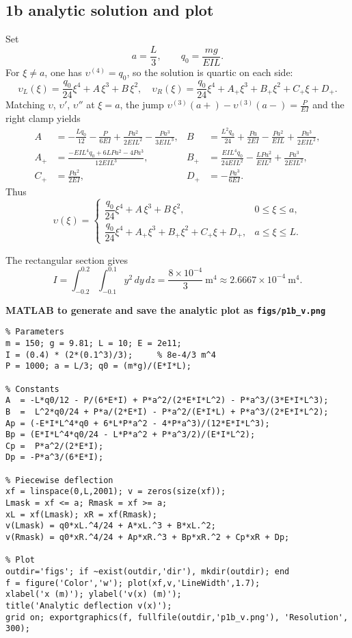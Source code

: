 \documentclass[12pt,a4paper]{article}
\begin{document}
\subsection*{1b  analytic solution and plot}

Set
\[
a=\frac{L}{3},\qquad q_{0}=\frac{m g}{E I L}.
\]
For $\xi\neq a$, one has $\upsilon^{(4)}=q_{0}$, so the solution is quartic on each side:
\[
\upsilon_{L}(\xi)=\frac{q_{0}}{24}\xi^{4}+A\,\xi^{3}+B\,\xi^{2},\quad
\upsilon_{R}(\xi)=\frac{q_{0}}{24}\xi^{4}+A_{+}\xi^{3}+B_{+}\xi^{2}+C_{+}\xi+D_{+}.
\]
Matching $\upsilon$, $\upsilon'$, $\upsilon''$ at $\xi=a$, the jump
\(
\upsilon^{(3)}(a+)-\upsilon^{(3)}(a-)=\frac{P}{E I}
\)
and the right clamp yields
\[
\begin{aligned}
A&=-\frac{L q_{0}}{12}-\frac{P}{6 E I}+\frac{P a^{2}}{2 E I L^{2}}-\frac{P a^{3}}{3 E I L^{3}},
&
B&=\frac{L^{2}q_{0}}{24}+\frac{P a}{2E I}-\frac{P a^{2}}{E I L}+\frac{P a^{3}}{2E I L^{2}},\\
A_{+}&=\frac{-E I L^{4} q_{0}+6 L P a^{2}-4 P a^{3}}{12 E I L^{3}},
&
B_{+}&=\frac{E I L^{4} q_{0}}{24 E I L^{2}}-\frac{L P a^{2}}{E I L^{2}}+\frac{P a^{3}}{2 E I L^{2}},\\
C_{+}&=\frac{P a^{2}}{2E I},\qquad
&
D_{+}&=-\frac{P a^{3}}{6E I}.
\end{aligned}
\]
Thus
\[
\upsilon(\xi)=
\begin{cases}
\dfrac{q_{0}}{24}\xi^{4}+A\,\xi^{3}+B\,\xi^{2}, & 0\le \xi\le a,\\[4pt]
\dfrac{q_{0}}{24}\xi^{4}+A_{+}\xi^{3}+B_{+}\xi^{2}+C_{+}\xi+D_{+}, & a\le \xi\le L.
\end{cases}
\]

The rectangular section gives
\[
I=\int_{-0.2}^{0.2}\!\int_{-0.1}^{0.1} y^{2}\,dy\,dz
=\frac{8\times 10^{-4}}{3}\ \mathrm{m^{4}}
\approx 2.6667\times 10^{-4}\ \mathrm{m^{4}}.
\]

\textbf{MATLAB to generate and save the analytic plot as \texttt{figs/p1b\_v.png}}
\begin{verbatim}
% Parameters
m = 150; g = 9.81; L = 10; E = 2e11;
I = (0.4) * (2*(0.1^3)/3);     % 8e-4/3 m^4
P = 1000; a = L/3; q0 = (m*g)/(E*I*L);

% Constants
A  = -L*q0/12 - P/(6*E*I) + P*a^2/(2*E*I*L^2) - P*a^3/(3*E*I*L^3);
B  =  L^2*q0/24 + P*a/(2*E*I) - P*a^2/(E*I*L) + P*a^3/(2*E*I*L^2);
Ap = (-E*I*L^4*q0 + 6*L*P*a^2 - 4*P*a^3)/(12*E*I*L^3);
Bp = (E*I*L^4*q0/24 - L*P*a^2 + P*a^3/2)/(E*I*L^2);
Cp =  P*a^2/(2*E*I);
Dp = -P*a^3/(6*E*I);

% Piecewise deflection
xf = linspace(0,L,2001); v = zeros(size(xf));
Lmask = xf <= a; Rmask = xf >= a;
xL = xf(Lmask); xR = xf(Rmask);
v(Lmask) = q0*xL.^4/24 + A*xL.^3 + B*xL.^2;
v(Rmask) = q0*xR.^4/24 + Ap*xR.^3 + Bp*xR.^2 + Cp*xR + Dp;

% Plot
outdir='figs'; if ~exist(outdir,'dir'), mkdir(outdir); end
f = figure('Color','w'); plot(xf,v,'LineWidth',1.7);
xlabel('x (m)'); ylabel('v(x) (m)');
title('Analytic deflection v(x)');
grid on; exportgraphics(f, fullfile(outdir,'p1b_v.png'), 'Resolution', 300);
\end{verbatim}
\end{document}
